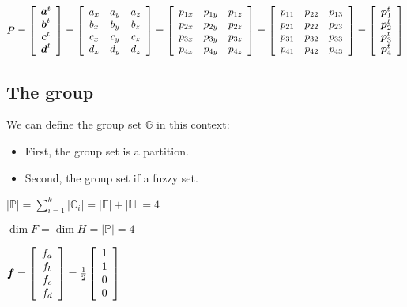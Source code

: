 \documentclass{article}
\newcommand{\bm}[1]{\mbox{\boldmath$#1$}}
\newcommand{\fm}[1]{\mathbb{#1}}
\newcommand{\df}[1]{|{\mathbb{#1}}|}
\begin{document}
\[
P =
\left[\begin{array}{c}
 \bm{a}^t \\
 \bm{b}^t \\
 \bm{c}^t \\
 \bm{d}^t
\end{array}\right]
=
\left[\begin{array}{ccc}
 a_x & a_y & a_z \\
 b_x & b_y & b_z \\
 c_x & c_y & c_z \\
 d_x & d_y & d_z
\end{array}\right]
=
\left[\begin{array}{ccc}
 p_{1x} & p_{1y} & p_{1z} \\
 p_{2x} & p_{2y} & p_{2z} \\
 p_{3x} & p_{3y} & p_{3z} \\
 p_{4x} & p_{4y} & p_{4z}
\end{array}\right]
=
\left[\begin{array}{ccc}
 p_{11} & p_{22} & p_{13} \\
 p_{21} & p_{22} & p_{23} \\
 p_{31} & p_{32} & p_{33} \\
 p_{41} & p_{42} & p_{43}
\end{array}\right]
=
\left[\begin{array}{c}
 \bm{p}_1^t \\
 \bm{p}_2^t \\
 \bm{p}_3^t \\
 \bm{p}_4^t
\end{array}\right]
\]

\subsection{The group}

We can define the group set $\fm{G}$ in this context:
\begin{itemize}
 \item First, the group set is a partition.
 \item Second, the group set if a fuzzy set.
\end{itemize}

$\df{P} = \sum_{i=1}^{k} |\fm{G}_i| = \df{F} + \df{H} = 4$

$\dim F = \dim H = \df{P} = 4$

$
\bm{f} = 
\left[\begin{array}{c}
 f_a \\
 f_b \\
 f_c \\
 f_d
\end{array}\right]
=
\frac{1}{2}
\left[\begin{array}{c}
 1 \\
 1 \\
 0 \\
 0
\end{array}\right]
$
\end{document}

